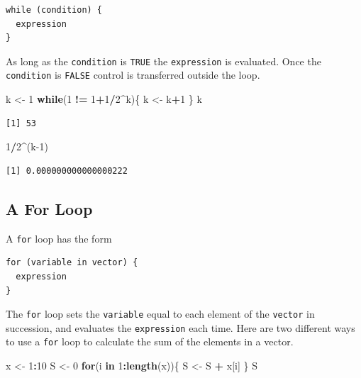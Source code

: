 \documentclass[
]{krantz}
\makeatletter
\newenvironment{Shaded}{\begin{snugshade}}{\end{snugshade}}
\newcommand{\ControlFlowTok}[1]{\textcolor[rgb]{0.27,0.27,0.27}{\textbf{#1}}}
\newcommand{\DecValTok}[1]{\textcolor[rgb]{0.06,0.06,0.06}{#1}}
\newcommand{\KeywordTok}[1]{\textcolor[rgb]{0.27,0.27,0.27}{\textbf{#1}}}
\newcommand{\NormalTok}[1]{#1}
\newcommand{\OperatorTok}[1]{\textcolor[rgb]{0.43,0.43,0.43}{\textbf{#1}}}
\newcommand{\StringTok}[1]{\textcolor[rgb]{0.5,0.5,0.5}{#1}}
\newenvironment{kframe}{%
\medskip{}
\setlength{\fboxsep}{.8em}
 \def\at@end@of@kframe{}%
 \ifinner\ifhmode%
  \def\at@end@of@kframe{\end{minipage}}%
  \begin{minipage}{\columnwidth}%
 \fi\fi%
 \def\FrameCommand##1{\hskip\@totalleftmargin \hskip-\fboxsep
 \colorbox{shadecolor}{##1}\hskip-\fboxsep
     \hskip-\linewidth \hskip-\@totalleftmargin \hskip\columnwidth}%
 \MakeFramed {\advance\hsize-\width
   \@totalleftmargin\z@ \linewidth\hsize
   \@setminipage}}%
 {\par\unskip\endMakeFramed%
 \at@end@of@kframe}
\renewenvironment{Shaded}{\begin{kframe}}{\end{kframe}}
\makeatother
\begin{document}
\begin{verbatim}
while (condition) {
  expression
}
\end{verbatim}

As long as the \texttt{condition} is \texttt{TRUE} the \texttt{expression} is evaluated. Once the \texttt{condition} is \texttt{FALSE} control is transferred outside the loop.

\begin{Shaded}
\begin{Highlighting}[]
\NormalTok{k \textless{}{-}}\StringTok{ }\DecValTok{1}
\ControlFlowTok{while}\NormalTok{(}\DecValTok{1} \OperatorTok{!=}\StringTok{ }\DecValTok{1}\OperatorTok{+}\DecValTok{1}\OperatorTok{/}\DecValTok{2}\OperatorTok{\^{}}\NormalTok{k)\{}
\NormalTok{    k \textless{}{-}}\StringTok{ }\NormalTok{k}\OperatorTok{+}\DecValTok{1} 
\NormalTok{\}}
\NormalTok{k}
\end{Highlighting}
\end{Shaded}

\begin{verbatim}
[1] 53
\end{verbatim}

\begin{Shaded}
\begin{Highlighting}[]
\DecValTok{1}\OperatorTok{/}\DecValTok{2}\OperatorTok{\^{}}\NormalTok{(k}\DecValTok{{-}1}\NormalTok{)}
\end{Highlighting}
\end{Shaded}

\begin{verbatim}
[1] 0.000000000000000222
\end{verbatim}

\hypertarget{a-for-loop}{%
\subsection{A For Loop}\label{a-for-loop}}

A \texttt{for} loop has the form

\begin{verbatim}
for (variable in vector) {
  expression
}
\end{verbatim}

The \texttt{for} loop sets the \texttt{variable} equal to each element of the \texttt{vector} in succession, and evaluates the \texttt{expression} each time. Here are two different ways to use a \texttt{for} loop to calculate the sum of the elements in a vector.

\begin{Shaded}
\begin{Highlighting}[]
\NormalTok{x \textless{}{-}}\StringTok{ }\DecValTok{1}\OperatorTok{:}\DecValTok{10}
\NormalTok{S \textless{}{-}}\StringTok{ }\DecValTok{0}
\ControlFlowTok{for}\NormalTok{(i }\ControlFlowTok{in} \DecValTok{1}\OperatorTok{:}\KeywordTok{length}\NormalTok{(x))\{}
\NormalTok{    S \textless{}{-}}\StringTok{ }\NormalTok{S }\OperatorTok{+}\StringTok{ }\NormalTok{x[i]}
\NormalTok{\}}
\NormalTok{S}
\end{Highlighting}
\end{Shaded}
\end{document}
